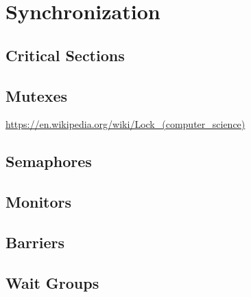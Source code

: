 \section{Synchronization}
\subsection{Critical Sections}
\subsection{Mutexes}

\url{https://en.wikipedia.org/wiki/Lock_(computer_science)}

\subsection{Semaphores}
\subsection{Monitors}
\subsection{Barriers}
\subsection{Wait Groups}

